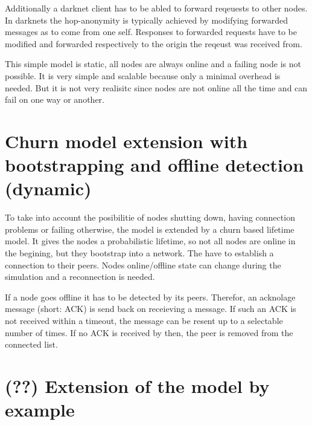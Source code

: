 Additionally a darknet client has to be abled to forward reqeuests to other nodes. In darknets the hop-anonymity is typically achieved by modifying forwarded messages as to come from one self. Responses to forwarded requests have to be modified and forwarded respectively to the origin the reqeust was received from.

This simple model is static, all nodes are always online and a failing node is not possible. It is very simple and scalable because only a minimal overhead is needed. But it is not very realisitc since nodes are not online all the time and can fail on one way or another.


\section{Churn model extension with bootstrapping and offline detection (dynamic)}

To take into account the posibilitie of nodes shutting down, having connection problems or failing otherwise, the model is extended by a churn based lifetime model. It gives the nodes a probabilistic lifetime, so not all nodes are online in the begining, but they bootstrap into a network. The have to establish a connection to their peers. Nodes online/offline state can change during the simulation and a reconnection is needed.

If a node goes offline it has to be detected by its peers. Therefor, an acknolage message (short: ACK) is send back on receieving a message. If such an ACK is not received within a timeout, the message can be resent up to a selectable number of times. If no ACK is received by then, the peer is removed from the connected list.

\section{(??) Extension of the model by example}
